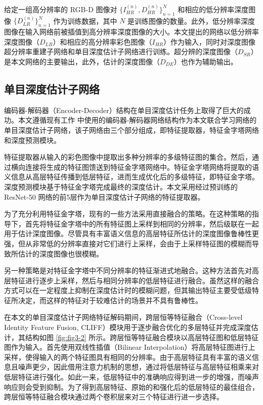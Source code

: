 \newpage
给定一组高分辨率的 RGB-D 图像对 $\{I_{HR}^{\left(n\right)},D_{HR}^{\left(n\right)}\}_{n=1}^N$ 和相应的低分辨率深度图像 $\{D_{LR}^{\left(n\right)}\}_{n=1}^N$ 作为训练数据，其中 $N$ 是训练图像的数量。此外，低分辨率深度图像在输入网络前被插值到高分辨率深度图像的大小。本文提出的网络以低分辨率深度图像（$D_{LR}$）和相应的高分辨率彩色图像（$I_{HR}$）作为输入，同时对深度图像超分辨率重建子网络和单目深度估计子网络进行训练。超分辨的深度图像（$D_{SR}$）是本文网络的主要输出，此外，估计的深度图像（$D_{DE}$）也作为辅助输出。

\subsection{单目深度估计子网络}

编码器-解码器（Encoder-Decoder）结构在单目深度估计任务上取得了巨大的成功。本文遵循现有工作 \cite{DBLP:conf/eccv/WangZWLR20} 中使用的编码器-解码器网络结构作为本文联合学习网络的单目深度估计子网络，该子网络由三个部分组成，即特征提取器，特征金字塔网络和深度预测模块。

特征提取器从输入的彩色图像中提取出多种分辨率的多级特征图的集合。然后，通过横向连接将生成的特征图馈送到特征金字塔网络中。特征金字塔网络将提取的语义信息从高层特征传播到低层特征，进而生成优化后的多级特征，即特征金字塔。深度预测模块基于特征金字塔完成最终的深度估计。本文采用经过预训练的 ResNet-50 网络的前5层作为单目深度估计子网络的特征提取器。

为了充分利用特征金字塔，现有的一些方法采用直接融合的策略。在这种策略的指导下，首先将特征金字塔中的所有特征图上采样到相同的分辨率，然后级联在一起用于估计深度图像。尽管具有丰富语义信息的高层特征所估计的深度图像鲁棒性更强，但从非常低的分辨率直接对它们进行上采样，会由于上采样特征图的模糊而导致所估计的深度图像也很模糊。

另一种策略是对特征金字塔中不同分辨率的特征渐进式地融合。这种方法首先对高层特征进行逐步上采样，然后与相同分辨率的低层特征进行融合。虽然这样的融合方式可以在一定程度上抑制在深度估计时的模糊问题，但其输出特征主要受低级特征所决定，而这样的特征对于较难估计的场景并不具有鲁棒性。

在本文的单目深度估计子网络特征解码期间，跨层恒等特征融合（Cross-level Identity Feature Fusion, CLIFF）模块用于逐步融合优化的多层特征并完成深度估计，其结构如图 \ref{fig:fig3-2} 所示。跨层恒等特征融合模块以高层特征图和低层特征图作为输入。首先使用双线性插值（Bilinear Interpolation）将高层特征图进行上采样，使得输入的两个特征图具有相同的分辨率。由于高层特征具有丰富的语义信息且噪声更少，因此借用注意力机制的思想，通过将低层特征与高层特征相乘来对低层特征进行强化。如此一来，低层特征中的准确响应得到进一步的增强，而噪声响应则会受到抑制。为了得到高层特征、原始的和强化后的低层特征的最佳组合，跨层恒等特征融合模块通过两个卷积层来对三个特征进行进一步选择。

